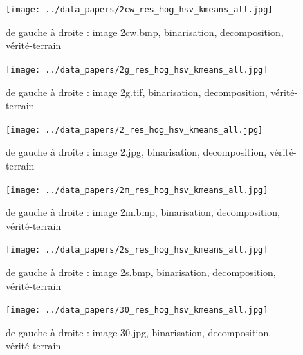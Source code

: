 \documentclass{book}
\begin{document}
\begin{figure}[H]
\begin{center}
\texttt{[image: ../data\_papers/2cw\_res\_hog\_hsv\_kmeans\_all.jpg]}
\end{center}
\caption{de gauche à droite : image 2cw.bmp, binarisation, decomposition, vérité-terrain}
\label{2cw}
\end{figure}
\clearpage


\begin{figure}[H]
\begin{center}
\texttt{[image: ../data\_papers/2g\_res\_hog\_hsv\_kmeans\_all.jpg]}
\end{center}
\caption{de gauche à droite : image 2g.tif, binarisation, decomposition, vérité-terrain}
\label{2g}
\end{figure}
\clearpage


\begin{figure}[H]
\begin{center}
\texttt{[image: ../data\_papers/2\_res\_hog\_hsv\_kmeans\_all.jpg]}
\end{center}
\caption{de gauche à droite : image 2.jpg, binarisation, decomposition, vérité-terrain}
\label{2}
\end{figure}
\clearpage


\begin{figure}[H]
\begin{center}
\texttt{[image: ../data\_papers/2m\_res\_hog\_hsv\_kmeans\_all.jpg]}
\end{center}
\caption{de gauche à droite : image 2m.bmp, binarisation, decomposition, vérité-terrain}
\label{2m}
\end{figure}
\clearpage


\begin{figure}[H]
\begin{center}
\texttt{[image: ../data\_papers/2s\_res\_hog\_hsv\_kmeans\_all.jpg]}
\end{center}
\caption{de gauche à droite : image 2s.bmp, binarisation, decomposition, vérité-terrain}
\label{2s}
\end{figure}
\clearpage


\begin{figure}[H]
\begin{center}
\texttt{[image: ../data\_papers/30\_res\_hog\_hsv\_kmeans\_all.jpg]}
\end{center}
\caption{de gauche à droite : image 30.jpg, binarisation, decomposition, vérité-terrain}
\label{30}
\end{figure}
\clearpage
\end{document}
